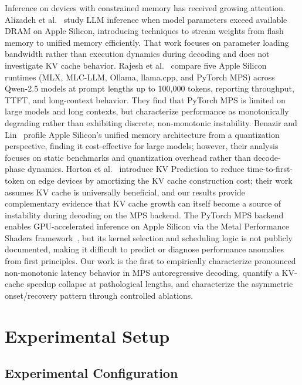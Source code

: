 \documentclass{article}
\begin{document}
Inference on devices with constrained memory has received growing attention.
Alizadeh et al.~\cite{alizadeh2024llmflash} study LLM inference when model parameters exceed available DRAM on Apple Silicon, introducing techniques to stream weights from flash memory to unified memory efficiently.
That work focuses on parameter loading bandwidth rather than execution dynamics during decoding and does not investigate KV cache behavior.
Rajesh et al.~\cite{rajesh2025production} compare five Apple Silicon runtimes (MLX, MLC-LLM, Ollama, llama.cpp, and PyTorch MPS) across Qwen-2.5 models at prompt lengths up to 100,000 tokens, reporting throughput, TTFT, and long-context behavior.
They find that PyTorch MPS is limited on large models and long contexts, but characterize performance as monotonically degrading rather than exhibiting discrete, non-monotonic instability.
Benazir and Lin~\cite{benazir2025profiling} profile Apple Silicon's unified memory architecture from a quantization perspective, finding it cost-effective for large models; however, their analysis focuses on static benchmarks and quantization overhead rather than decode-phase dynamics.
Horton et al.~\cite{horton2024kvprediction} introduce KV Prediction to reduce time-to-first-token on edge devices by amortizing the KV cache construction cost; their work assumes KV cache is universally beneficial, and our results provide complementary evidence that KV cache growth can itself become a source of instability during decoding on the MPS backend.
The PyTorch MPS backend~\cite{pytorch2022mps} enables GPU-accelerated inference on Apple Silicon via the Metal Performance Shaders framework~\cite{apple2026mps}, but its kernel selection and scheduling logic is not publicly documented, making it difficult to predict or diagnose performance anomalies from first principles.
Our work is the first to empirically characterize pronounced non-monotonic latency behavior in MPS autoregressive decoding, quantify a KV-cache speedup collapse at pathological lengths, and characterize the asymmetric onset/recovery pattern through controlled ablations.

\section{Experimental Setup}

\subsection{Experimental Configuration}
\end{document}
